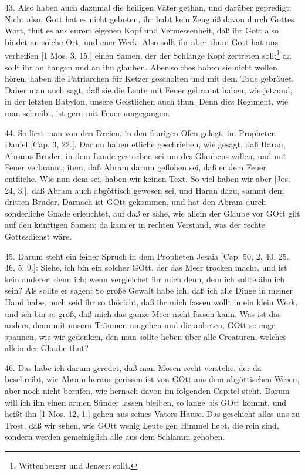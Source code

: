 43. Also haben auch dazumal die heiligen Väter gethan, und darüber gepredigt: Nicht also, Gott hat es nicht geboten, ihr habt kein Zeugniß davon durch Gottes Wort, thut es aus eurem eigenen Kopf und Vermessenheit, daß ihr Gott also bindet an solche Ort- und euer Werk. Also sollt ihr aber thun: Gott hat uns verheißen [1 Mos. 3, 15.] einen Samen, der der Schlange Kopf zertreten soll;\footnote{Wittenberger und Jenser: sollt.} da sollt ihr an hangen und an ihn glauben. Aber solches haben sie nicht wollen hören, haben die Patriarchen für Ketzer gescholten und mit dem Tode gebräuet. Daher man auch sagt, daß sie die Leute mit Feuer gebrannt haben, wie jetzund, in der letzten
Babylon, unsere Geistlichen auch thun. Denn dies Regiment, wie man schreibt, ist gern mit Feuer umgegangen.

44. So liest man von den Dreien, in den feurigen Ofen gelegt, im Propheten Daniel [Cap. 3, 22.]. Darum haben etliche geschrieben, wie gesagt, daß Haran, Abrams Bruder, in dem Lande gestorben sei um des Glaubens willen, und mit Feuer verbrannt; item, daß Abram darum geflohen sei, daß er dem Feuer entfliehe. Wie nun dem sei, haben wir keinen Text. So viel haben wir aber [Jos. 24, 3.], daß Abram auch abgöttisch gewesen sei, und Haran dazu, sammt dem dritten Bruder. Darnach ist GOtt gekommen, und hat den Abram durch sonderliche Gnade erleuchtet, auf daß er sähe, wie allein der Glaube vor GOtt gilt auf den künftigen Samen; da kam er in rechten Verstand, was der rechte Gottesdienst wäre.

45. Darum steht ein feiner Spruch in dem Propheten Jesaia [Cap. 50, 2. 40, 25. 46, 5. 9.]: Siehe, ich bin ein solcher GOtt, der das Meer trocken macht, und ist kein anderer, denn ich; wenn vergleichet ihr mich denn, dem ich sollte ähnlich sein? Als sollte er sagen: So große Gewalt habe ich, daß ich alle Dinge in meiner Hand habe, noch seid ihr so thöricht, daß ihr mich fassen wollt in ein klein Werk, und ich bin so groß, daß mich das ganze Meer nicht fassen kann. Was ist das anders, denn mit unsern Träumen umgehen und die anbeten, GOtt so enge spannen, wie wir gedenken, den man sollte heben über alle Creaturen, welches allein der Glaube thut?

46. Das habe ich darum geredet, daß man Mosen recht verstehe, der da beschreibt, wie Abram heraus gerissen ist von GOtt aus dem abgöttischen Wesen, aber noch nicht berufen, wie hernach davon im folgenden Capitel steht. Darum will ich ihn einen armen Sünder lassen bleiben, so lange bis GOtt kommt, und heißt ihn [1 Mos. 12, 1.] gehen aus seines Vaters Hause. Das geschieht alles uns zu Trost, daß wir sehen, wie GOtt wenig Leute gen Himmel hebt, die rein sind, sondern werden gemeiniglich alle aus dem Schlamm gehoben.

